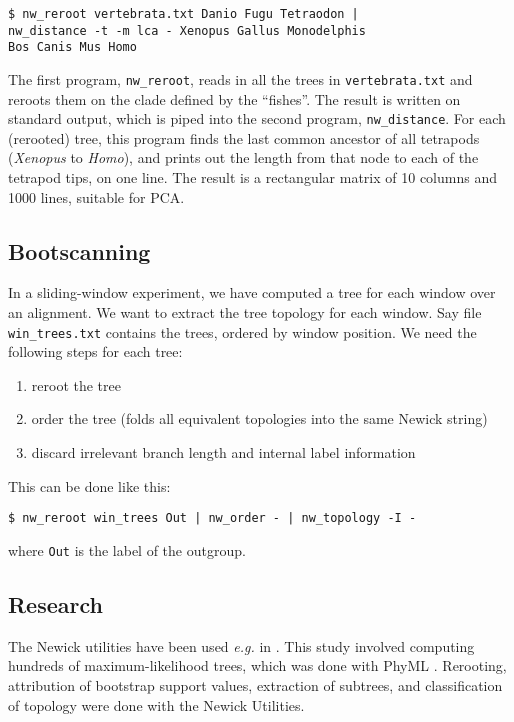 \documentclass[a4paper,11pt]{article}
\newcommand{\prog}[1]{\texttt{nw\_#1}}
\newcommand{\nutils}{Newick Utilities}
\begin{document}
\begin{verbatim}
$ nw_reroot vertebrata.txt Danio Fugu Tetraodon | 
nw_distance -t -m lca - Xenopus Gallus Monodelphis
Bos Canis Mus Homo 
\end{verbatim}

The first program, \prog{reroot}, reads in all the trees in \texttt{vertebrata.txt} and reroots them on the clade defined by the ``fishes''. The result is written on standard output, which is piped into the second program, \prog{distance}. For each (rerooted) tree, this program finds the last common ancestor of all tetrapods (\textit{Xenopus} to \textit{Homo}), and prints out the length from that node to each of the tetrapod tips, on one line. The result is a rectangular matrix of 10 columns and 1000 lines, suitable for \textsc{PCA}.

\subsection*{Bootscanning}

In a sliding-window experiment, we have computed a tree for each window over an alignment. We want to extract the tree topology for each window. Say file \texttt{win\_trees.txt} contains the trees, ordered by window position. We need the following steps for each tree:
\begin{enumerate}
 \item reroot the tree
 \item order the tree (folds all equivalent topologies into the same Newick string)
 \item discard irrelevant branch length and internal label information
\end{enumerate}
This can be done like this:
\begin{verbatim}
$ nw_reroot win_trees Out | nw_order - | nw_topology -I -
\end{verbatim}
where \verb|Out| is the label of the outgroup.

\subsection*{Research}

The Newick utilities have been used \textit{e.g.} in \cite{Tapparel2007}. This study involved computing hundreds of maximum-likelihood trees, which was done with PhyML \cite{Guindon2003}. Rerooting, attribution of bootstrap support values, extraction of subtrees, and classification of topology were done with the \nutils{}.
\end{document}
